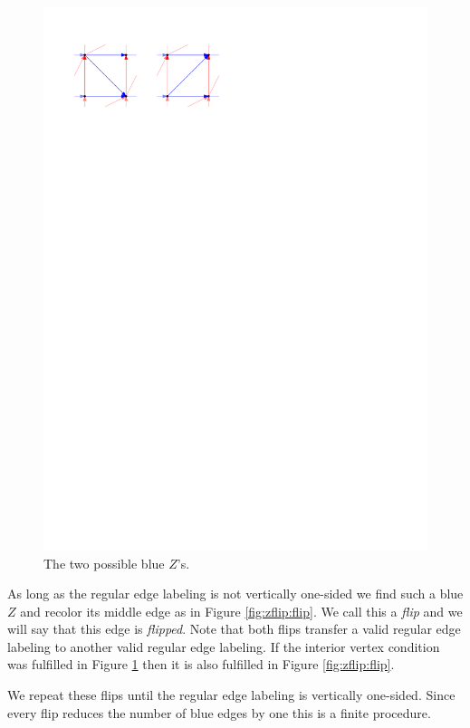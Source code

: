   \begin{figure}[h]
    \centering
    \includegraphics[scale=1]{unifiedAlgo/img/zflip/blueZ.pdf}
    \caption{The two possible blue $Z$'s.}
    \label{fig:zflip:blueZ}
  \end{figure}

  As long as the regular edge labeling is not vertically one-sided we find such a blue $Z$ and recolor its middle edge as in Figure \ref{fig:zflip:flip}. We call this a \emph{flip} and we will say that this edge is \emph{flipped}.
  Note that both flips transfer a valid regular edge labeling to another valid regular edge labeling. If the interior vertex condition was fulfilled in Figure \ref{fig:zflip:blueZ} then it is also fulfilled in Figure \ref{fig:zflip:flip}.

   We repeat these flips until the regular edge labeling is vertically one-sided.
   Since every flip reduces the number of blue edges by one this is a finite procedure.

